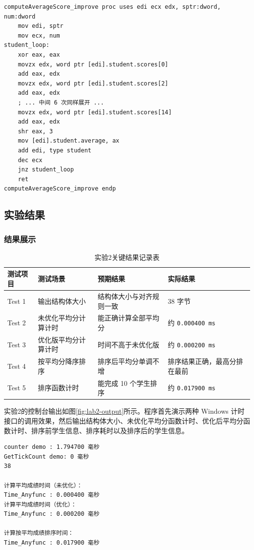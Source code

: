 \documentclass[supercite]{Experimental_Report}
\theoremstyle{definition}
\begin{document}
\begin{lstlisting}[language={[x86masm]Assembler}, caption={优化版平均分计算核心代码}, label={lst:lab2-asm}]
computeAverageScore_improve proc uses edi ecx edx, sptr:dword, num:dword
    mov edi, sptr
    mov ecx, num
student_loop:
    xor eax, eax
    movzx edx, word ptr [edi].student.scores[0]
    add eax, edx
    movzx edx, word ptr [edi].student.scores[2]
    add eax, edx
    ; ... 中间 6 次同样展开 ...
    movzx edx, word ptr [edi].student.scores[14]
    add eax, edx
    shr eax, 3
    mov [edi].student.average, ax
    add edi, type student
    dec ecx
    jnz student_loop
    ret
computeAverageScore_improve endp
\end{lstlisting}

\subsection{实验结果}
\subsubsection{结果展示}
\begin{table}[H]
  \centering
  \caption{实验2关键结果记录表}
  \label{tbl:lab2-result}
  \begin{tabular}{p{}p{}p{}p{}}
    \toprule
    测试项目 & 测试场景 & 预期结果 & 实际结果 \\
    \midrule
    Test 1 & 输出结构体大小 & 结构体大小与对齐规则一致 & 38 字节 \\
    Test 2 & 未优化平均分计算计时 & 能正确计算全部平均分 & 约 \texttt{0.000400 ms} \\
    Test 3 & 优化版平均分计算计时 & 时间不高于未优化版 & 约 \texttt{0.000200 ms} \\
    Test 4 & 按平均分降序排序 & 排序后平均分单调不增 & 排序结果正确，最高分排在最前 \\
    Test 5 & 排序函数计时 & 能完成 10 个学生排序 & 约 \texttt{0.017900 ms} \\
    \bottomrule
  \end{tabular}
\end{table}

实验2的控制台输出如图\ref{fig:lab2-output}所示。程序首先演示两种 Windows 计时接口的调用效果，然后输出结构体大小、未优化平均分函数计时、优化后平均分函数计时、排序前学生信息、排序耗时以及排序后的学生信息。

\begin{lstlisting}[language={}, caption={实验2关键运行结果摘录}, label={lst:lab2-output}]
counter demo : 1.794700 毫秒
GetTickCount demo: 0 毫秒
38

计算平均成绩时间（未优化）：
Time_Anyfunc : 0.000400 毫秒
计算平均成绩时间（优化）：
Time_Anyfunc : 0.000200 毫秒

计算按平均成绩排序时间：
Time_Anyfunc : 0.017900 毫秒
\end{lstlisting}
\end{document}

